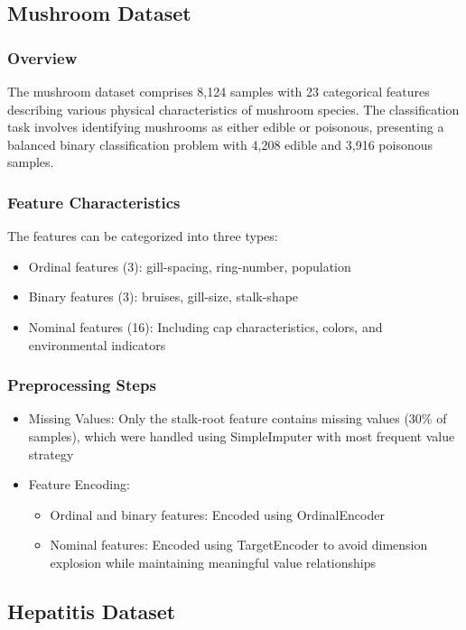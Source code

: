 \subsection{Mushroom Dataset}
\subsubsection{Overview}
The mushroom dataset comprises 8,124 samples with 23 categorical features describing various physical characteristics of mushroom species. The classification task involves identifying mushrooms as either edible or poisonous, presenting a balanced binary classification problem with 4,208 edible and 3,916 poisonous samples.

\subsubsection{Feature Characteristics}
The features can be categorized into three types:
\begin{itemize}
    \item Ordinal features (3): gill-spacing, ring-number, population
    \item Binary features (3): bruises, gill-size, stalk-shape
    \item Nominal features (16): Including cap characteristics, colors, and environmental indicators
\end{itemize}

\subsubsection{Preprocessing Steps}
\begin{itemize}
    \item Missing Values: Only the stalk-root feature contains missing values (30\% of samples), which were handled using SimpleImputer with most frequent value strategy
    \item Feature Encoding:
    \begin{itemize}
        \item Ordinal and binary features: Encoded using OrdinalEncoder
        \item Nominal features: Encoded using TargetEncoder to avoid dimension explosion while maintaining meaningful value relationships
    \end{itemize}
\end{itemize}

\subsection{Hepatitis Dataset}
